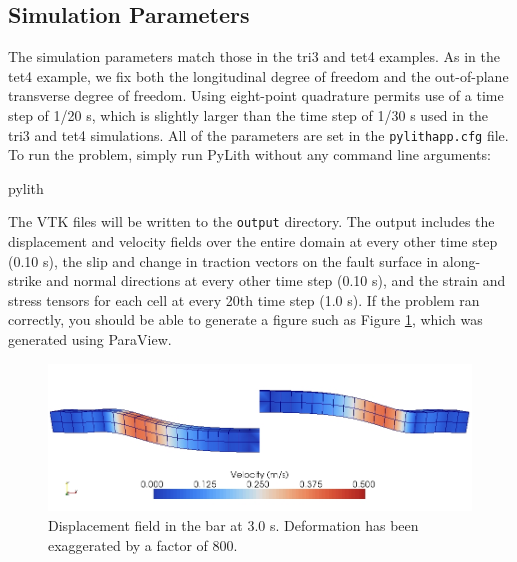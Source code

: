\subsection{Simulation Parameters}

The simulation parameters match those in the tri3 and tet4 examples.
As in the tet4 example, we fix both the longitudinal degree of freedom
and the out-of-plane transverse degree of freedom. Using eight-point
quadrature permits use of a time step of 1/20 s, which is slightly
larger than the time step of 1/30 s used in the tri3 and tet4 simulations.
All of the parameters are set in the \texttt{pylithapp.cfg} file.
To run the problem, simply run PyLith without any command line arguments:
\begin{lyxcode}
pylith
\end{lyxcode}
The VTK files will be written to the \texttt{output} directory. The
output includes the displacement and velocity fields over the entire
domain at every other time step (0.10 s), the slip and change in traction
vectors on the fault surface in along-strike and normal directions
at every other time step (0.10 s), and the strain and stress tensors
for each cell at every 20th time step (1.0 s). If the problem ran
correctly, you should be able to generate a figure such as Figure
\ref{fig:shearwave:hex8:deform}, which was generated using ParaView.

\noindent \begin{center}
\begin{figure}
\begin{centering}
\includegraphics[scale=0.5]{tutorials/shearwave/figs/hex8deform30}
\par\end{centering}

\caption{Displacement field in the bar at 3.0 s. Deformation has been exaggerated
by a factor of 800.\label{fig:shearwave:hex8:deform}}
\end{figure}

\par\end{center}
